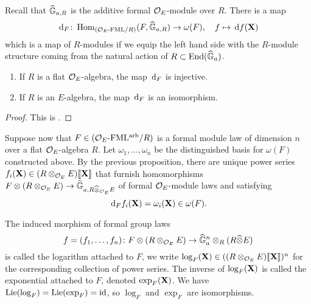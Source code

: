\documentclass[../main.tex]{subfiles}
\begin{document}
Recall that $\widehat{\mathbb{G}}_{a,R}$ is the additive formal ${\mathcal{O}_E}$-module over $R$. There is a map
\begin{equation} \label{eq:functorinvdifftohom}
  \, \mathrm{d}_{F} \colon  \operatorname{Hom}_{{({\mathcal{O}_E}\textnormal-\allowbreak\mathrm{FML}/{R})}} ({F}, \widehat{\mathbb{G}}_{a,R}) \to \omega({F}), \quad f \mapsto \, \mathrm{d} f(\mathbf{X})
\end{equation}
which is a map of $R$-modules if we equip the left hand side with the $R$-module
structure coming from the natural action of $R \subset \operatorname{End}(\widehat{\mathbb{G}}_a)$. 
\begin{prop}\label{prop:loginvdiff}
  \begin{enumerate}
    \item If $R$ is a flat ${\mathcal{O}_E}$-algebra, the map $\, \mathrm{d}_F$ is injective.
    \item If $R$ is an $E$-algebra, the map $\, \mathrm{d}_F$ is an isomorphism.
  \end{enumerate}
\begin{proof}
  This is \cite[Proposition 3.2]{hopkins1994equivariant}.
\end{proof}
\end{prop}

Suppose now that $F \in {({\mathcal{O}_E}\textnormal-\allowbreak\mathrm{FML^{arb}}/{R})}$ is a formal module law of dimension $n$
over a flat ${\mathcal{O}_E}$-algebra $R$. 
Let $\omega_1, \dots, \omega_n$ be the distinguished basis for $\omega(F)$
constructed above. 
By the previous proposition, there are unique power series 
$f_i(\mathbf{X}) \in (R \otimes_{\mathcal{O}_E} E)\llbracket \mathbf{X} \rrbracket$ that furnish homomorphisms
$F \otimes (R \otimes_{\mathcal{O}_E} E) \to \widehat{\mathbb{G}}_{a,R\widehat \otimes_{\mathcal{O}_E}E}$ of formal
${\mathcal{O}_E}$-module laws
and satisfying
\begin{equation*}
  \, \mathrm{d}_F f_i(\mathbf{X}) = \omega_i(\mathbf{X}) \in \omega(F).
\end{equation*}
\begin{defi}
  The induced morphism of formal group laws
  \begin{equation*}
    f = (f_1, \dots, f_n) \colon  F \otimes (R \otimes_{\mathcal{O}_E} E) \to \widehat{\mathbb{G}}_a^n \otimes_R (R \widehat \otimes E)
  \end{equation*}
  is called the logarithm attached to $F$, we write 
  $\log_F(\mathbf{X}) \in ((R \otimes_{\mathcal{O}_E} E)\llbracket \mathbf{X} \rrbracket)^n$ for the corresponding collection
  of power series. The inverse of $\log_F(\mathbf{X})$ is called the exponential 
  attached to $F$, denoted $\exp_F(\mathbf{X})$. We have $\operatorname{Lie}(\log_F) = \operatorname{Lie}(\exp_F) = \operatorname{id}$,
  so $\log_F$ and $\exp_F$ are isomorphisms.
\end{defi}
\end{document}

